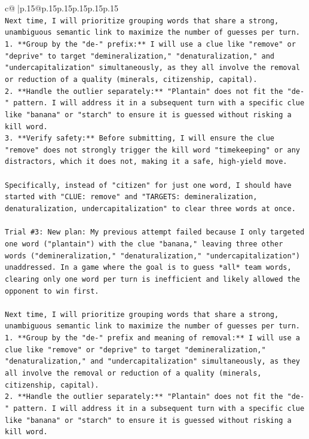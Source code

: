 \documentclass{article}
\begin{document}
{\begin{supertabular}{c@{$\;$}|p{.15\linewidth}@{}p{.15\linewidth}p{.15\linewidth}p{.15\linewidth}p{.15\linewidth}p{.15\linewidth}}
{{{\\ 
\texttt{Next time, I will prioritize grouping words that share a strong, unambiguous semantic link to maximize the number of guesses per turn.} \\
\texttt{1.  **Group by the "de{-}" prefix:** I will use a clue like "remove" or "deprive" to target "demineralization," "denaturalization," and "undercapitalization" simultaneously, as they all involve the removal or reduction of a quality (minerals, citizenship, capital).} \\
\texttt{2.  **Handle the outlier separately:** "Plantain" does not fit the "de{-}" pattern. I will address it in a subsequent turn with a specific clue like "banana" or "starch" to ensure it is guessed without risking a kill word.} \\
\texttt{3.  **Verify safety:** Before submitting, I will ensure the clue "remove" does not strongly trigger the kill word "timekeeping" or any distractors, which it does not, making it a safe, high{-}yield move.} \\
\\ 
\texttt{Specifically, instead of "citizen" for just one word, I should have started with "CLUE: remove" and "TARGETS: demineralization, denaturalization, undercapitalization" to clear three words at once.} \\
\\ 
\texttt{Trial \#3: New plan: My previous attempt failed because I only targeted one word ("plantain") with the clue "banana," leaving three other words ("demineralization," "denaturalization," "undercapitalization") unaddressed. In a game where the goal is to guess *all* team words, clearing only one word per turn is inefficient and likely allowed the opponent to win first.} \\
\\ 
\texttt{Next time, I will prioritize grouping words that share a strong, unambiguous semantic link to maximize the number of guesses per turn.} \\
\texttt{1.  **Group by the "de{-}" prefix and meaning of removal:** I will use a clue like "remove" or "deprive" to target "demineralization," "denaturalization," and "undercapitalization" simultaneously, as they all involve the removal or reduction of a quality (minerals, citizenship, capital).} \\
\texttt{2.  **Handle the outlier separately:** "Plantain" does not fit the "de{-}" pattern. I will address it in a subsequent turn with a specific clue like "banana" or "starch" to ensure it is guessed without risking a kill word.} \\
}}}
\end{supertabular}}
\end{document}
